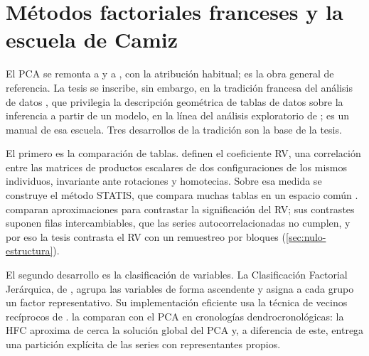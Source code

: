\section{Métodos factoriales franceses y la escuela de Camiz}
\label{sec:ea-factoriales}

El PCA se remonta a \textcite{pearson_1901} y a \textcite{hotelling_1933}, con la atribución
habitual; \textcite{jolliffe_2002} es la obra general de referencia. La tesis se inscribe, sin
embargo, en la tradición francesa del análisis de datos
\parencite{benzecri_1973}, que privilegia la descripción geométrica de tablas de datos sobre la
inferencia a partir de un modelo, en la línea del análisis exploratorio de
\textcite{tukey_1977}; \textcite{lebart_morineau_piron_1995} es un manual de esa escuela.
Tres desarrollos de la tradición son la base de la tesis.

El primero es la comparación de tablas. \textcite{robert_escoufier_1976} definen el coeficiente RV, una correlación entre las matrices de productos
escalares de dos configuraciones de los mismos individuos, invariante ante rotaciones y
homotecias. Sobre esa medida se construye el método STATIS, que compara muchas tablas en un
espacio común \parencite{lavit_1988}. \textcite{josse_pages_husson_2008} comparan
aproximaciones para contrastar la significación del RV; sus contrastes suponen filas
intercambiables, que las series autocorrelacionadas no cumplen, y por eso la tesis contrasta el RV
con un remuestreo por bloques (\cref{sec:nulo-estructura}).

El segundo desarrollo es la clasificación de variables. La Clasificación Factorial Jerárquica, de
\textcite{denimal_2007}, agrupa las variables de forma ascendente y asigna a cada grupo un factor
representativo. Su implementación eficiente usa la técnica de vecinos recíprocos de
\textcite{bruynooghe_1978}.
\textcite{camiz_et_al_2020} la comparan con el PCA en cronologías dendrocronológicas: la HFC
aproxima de cerca la solución global del PCA y, a diferencia de este, entrega una partición
explícita de las series con representantes propios.

